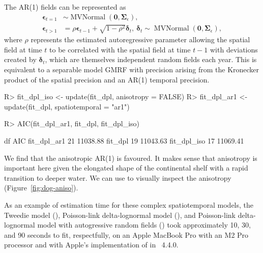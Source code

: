 \documentclass[article]{jss}\usepackage[]{graphicx}\usepackage[dvipsnames]{xcolor}
\newcommand{\fct}[1]{\code{#1()}}
\newcommand{\R}{\proglang{R}}
\begin{document}
The AR(1) fields can be represented as
\[
\begin{aligned}
\bm{\epsilon}_{t=1} &\sim \operatorname{MVNormal} (\bm{0}, \bm{\Sigma}_{\epsilon}),\\
\bm{\epsilon}_{t>1} &= \rho \bm{\epsilon}_{t-1} + \sqrt{1 - \rho^2} \bm{\delta}_{t},  \:
\bm{\delta}_{t} \sim \operatorname{MVNormal} \left(\bm{0}, \bm{\Sigma}_{\epsilon} \right),
\end{aligned}
\]
where $\rho$ represents the estimated autoregressive parameter allowing the spatial field at time $t$ to be correlated with the spatial field at time $t-1$ with deviations created by $\bm{\delta}_t$, which are themselves independent random fields each year.
This is equivalent to a separable model GMRF with precision arising from the Kronecker product of the spatial precision and an AR(1) temporal precision.

\begin{Schunk}
\begin{Sinput}
R> fit_dpl_iso <- update(fit_dpl, anisotropy = FALSE)
R> fit_dpl_ar1 <- update(fit_dpl, spatiotemporal = "ar1")
\end{Sinput}
\end{Schunk}

\begin{Schunk}
\begin{Sinput}
R> AIC(fit_dpl_ar1, fit_dpl, fit_dpl_iso)
\end{Sinput}
\begin{Soutput}
            df      AIC
fit_dpl_ar1 21 11038.88
fit_dpl     19 11043.63
fit_dpl_iso 17 11069.41
\end{Soutput}
\end{Schunk}

We find that the anisotropic AR(1) is favoured. It makes sense that anisotropy is important here given the elongated shape of the continental shelf with a rapid transition to deeper water. We can use \fct{plot\_anisotropy} to visually inspect the anisotropy (Figure~\ref{fig:dog-aniso}).

As an example of estimation time for these complex spatiotemporal models, the Tweedie model (), Poisson-link delta-lognormal model (), and Poisson-link delta-lognormal model with autogressive random fields () took approximately 10, 30, and 90 seconds to fit, respectfully, on an Apple MacBook Pro with an M2 Pro processor and with Apple's  implementation of  in \R\ 4.4.0.
\end{document}
